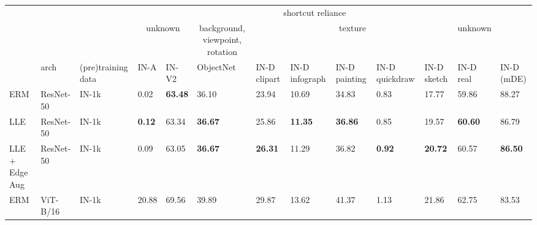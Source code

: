 \documentclass[10pt,twocolumn,letterpaper]{article}
\begin{document}
\begin{table}[t]
\centering
\begin{adjustbox}{width=\linewidth}
\begin{tabular}{@{}lllllllllllll@{}}
\toprule
                           &           & \multicolumn{1}{l|}{}                   & \multicolumn{9}{c|}{shortcut reliance}                                                                                                                                                                                                     &                \\ \cmidrule(lr){4-12}
                           &           & \multicolumn{1}{l|}{}                   & \multicolumn{2}{c|}{unknown}                & \multicolumn{1}{c|}{background, viewpoint, rotation} & \multicolumn{5}{c|}{texture}                                                                         & \multicolumn{1}{c|}{unknown}   &                \\
                           & arch      & \multicolumn{1}{l|}{(pre)training data} & IN-A           & \multicolumn{1}{l|}{IN-V2} & \multicolumn{1}{l|}{ObjectNet}                       & IN-D clipart   & IN-D infograph & IN-D painting  & IN-D quickdraw & \multicolumn{1}{l|}{IN-D sketch} & \multicolumn{1}{l|}{IN-D real} & IN-D (mDE)     \\ \midrule
ERM                        & ResNet-50 & IN-1k                                   & 0.02           & \textbf{63.48}             & 36.10                                                & 23.94          & 10.69          & 34.83          & 0.83           & 17.77                            & 59.86                          & 88.27          \\
LLE                        & ResNet-50 & IN-1k                                   & \textbf{0.12}  & 63.34                      & \textbf{36.67}                                       & 25.86          & \textbf{11.35} & \textbf{36.86} & 0.85           & 19.57                            & \textbf{60.60}                 & 86.79          \\
LLE + Edge Aug             & ResNet-50 & IN-1k                                   & 0.09           & 63.05                      & \textbf{36.67}                                       & \textbf{26.31} & 11.29          & 36.82          & \textbf{0.92}  & \textbf{20.72}                   & 60.57                          & \textbf{86.50} \\ \midrule
ERM                        & ViT-B/16  & IN-1k                                   & 20.88          & 69.56                      & 39.89                                                & 29.87          & 13.62          & 41.37          & 1.13           & 21.86                            & 62.75                          & 83.53          \\ \cmidrule(l){4-13}

\end{tabular}
\end{adjustbox}
\end{table}
\end{document}

